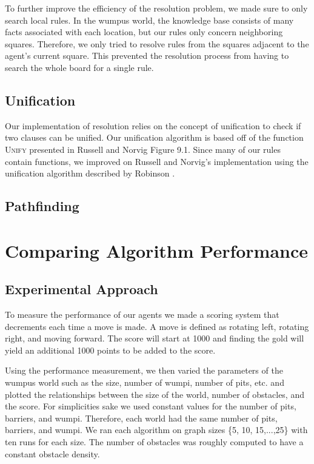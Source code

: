 \documentclass{article}
\begin{document}
To further improve the efficiency of the resolution problem, we made sure to only search local rules. In the wumpus world, the knowledge base consists of many facts associated with each location, but our rules only concern neighboring squares. Therefore, we only tried to resolve rules from the squares adjacent to the agent's current square. This prevented the resolution process from having to search the whole board for a single rule.
\subsection{Unification}

Our implementation of resolution relies on the concept of unification to check if two clauses can be unified. Our unification algorithm is based off of the function \textsc{Unify} presented in Russell and Norvig Figure 9.1. Since many of our rules contain functions, we improved on Russell and Norvig's implementation using the unification algorithm described by Robinson \cite{robinson}.

\subsection{Pathfinding}

		

\section{Comparing Algorithm Performance}
	\label{comparisons}
	
	\subsection{Experimental Approach}
	To measure the performance of our agents we made a scoring system that decrements each time a move is made.
	 A move is defined as rotating left, rotating right, and moving forward.
	  The score will start at 1000 and finding the gold will yield an additional 1000 points to be added to the score.
	
	Using the performance measurement, we then varied the parameters of the wumpus world such as the size, number of wumpi, number of pits, etc. and plotted the relationships between the size of the world, number of obstacles, and the score.
	 For simplicities sake we used constant values for the number of pits, barriers, and wumpi.
	  Therefore, each world had the same number of pits, barriers, and wumpi. 
	  We ran each algorithm on graph sizes \{5, 10, 15,...,25\} with ten runs for each size.
	  The number of obstacles was roughly computed to have a constant obstacle density.
	
\end{document}
